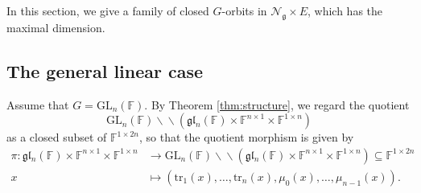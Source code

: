 \documentclass[12pt]{amsart}
\newtheorem{prop}[lm]{Proposition}
\theoremstyle{definition}
\theoremstyle{remark}\newtheorem{rmk}[lm]{Remark}
\newcommand{\CN}{{\mathcal {N}}}
\newcommand{\GL}{{\mathrm{GL}}}
\newcommand{\tr}{{\mathrm{tr}}}
\newcommand{\g}{\mathfrak g}
\newcommand{\gl}{\mathfrak g \mathfrak l}
\newcommand{\C}{\mathbb{F}}
\newcommand{\bac}{\backslash\!\!\backslash}
\begin{document}
	In this section, we give a family of closed $G$-orbits in $\CN_\g\times E$, which has the maximal dimension.

   
    \subsection{The general linear case}
    Assume that $G=\GL_n(\C)$. By Theorem \ref{thm:structure}, we regard the quotient $$\GL_n(\C)\bac(\gl_n(\C)\times\C^{n\times 1}\times\C^{1\times n})$$ as a closed subset of $\C^{1\times 2n}$, so that the quotient morphism is given by
	\begin{align*}
		\pi:\gl_n(\C)\times\C^{n\times 1}\times\C^{1\times n}&\to\GL_n(\C)\bac(\gl_n(\C)\times\C^{n\times 1}\times\C^{1\times n})\subseteq\C^{1\times 2n}\\
		x&\mapsto(\tr_1(x),\dots,\tr_n(x),\mu_0(x),\dots,\mu_{n-1}(x)).
	\end{align*}
\end{document}
